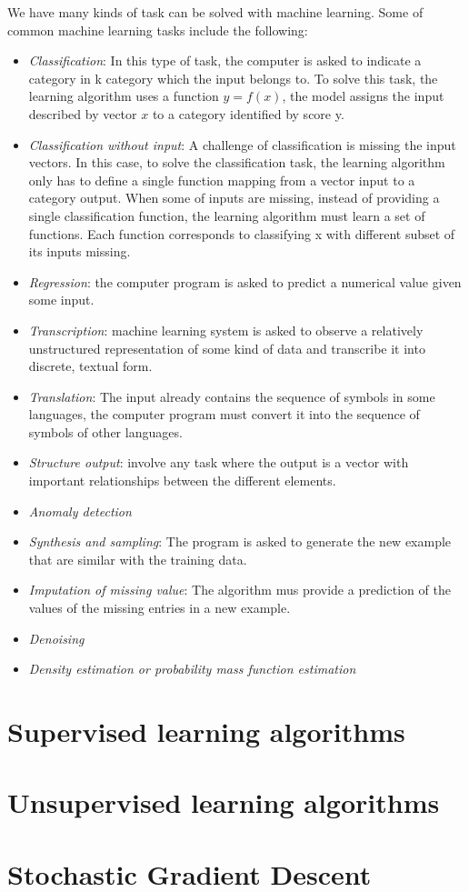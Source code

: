  We have many kinds of task can be solved with machine learning. Some of common machine learning tasks include the following:
\begin{itemize}
	\item \textit{Classification}: In this type of task, the computer is asked to indicate a category in k category which the input belongs to. To solve this task, the learning algorithm uses a function $y=f(x)$, the model assigns the input described by vector $x$ to a category identified by score y.
	\item \textit{Classification without input}: A challenge of classification is missing the input vectors. In this case, to solve the classification task, the learning algorithm only has to define a single function mapping from a vector input to a category output. When some of inputs are missing, instead of providing a single classification function, the learning algorithm must learn a set of functions. Each function corresponds to classifying x with different subset of its inputs missing.
	\item \textit{Regression}: the computer program is asked to predict a numerical value given some input.
	\item \textit{Transcription}: machine learning system is asked to observe a relatively unstructured representation of some kind of data and transcribe it into discrete, textual form.
	\item \textit{Translation}: The input already contains the sequence of symbols in some languages, the computer program must convert it into the sequence of symbols of other languages.
	\item \textit{Structure output}: involve any task where the output is a vector with important relationships between the different elements.
	\item \textit{Anomaly detection}
	\item \textit{Synthesis and sampling}: The program is asked to generate the new example that are similar with the training data.
	\item \textit{Imputation of missing value}: The algorithm mus provide a prediction of the values of the missing entries in a new example.
	\item \textit{Denoising}
	\item \textit{Density estimation or probability mass function estimation}
\end{itemize}
\section{Supervised learning algorithms}
\section{Unsupervised learning algorithms}
\section{Stochastic Gradient Descent}